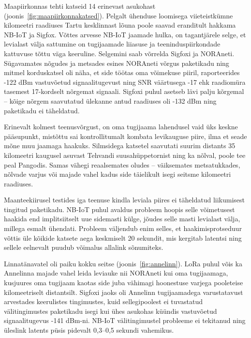 \documentclass[12pt]{article}
\begin{document}
    Maapiirkonnas tehti katseid 14 erinevast asukohast (joonis~\ref{fig:maapiirkonnakatsed}). Pelgalt ühenduse loomisega viieteistkümne kilomeetri raadiuses Tartu kesklinnast lõuna poole saavad eranditult hakkama NB-IoT ja Sigfox.
    Võttes arvesse NB-IoT jaamade hulka, on tagantjärele selge, et levialast välja sattumine on tugijaamade liiasuse ja teeninduspiirkondade kattuvuse tõttu väga keeruline.
    Selgemini saab võrrelda Sigfoxi ja NORAneti.
    Sügavamates nõgudes ja metsades esines NORAneti võrgus paketikadu ning mitmel korduskatsel oli näha, et side töötas oma võimekuse piiril, raporteerides -122 dBm vastuvõetud signaalitugevust ning SNR väärtusega -17 ehk raadiomüra tasemest 17-kordselt nõrgemat signaali.
    Sigfoxi puhul asetseb lävi palju kõrgemal -- kõige nõrgem saavutatud ülekanne antud raadiuses oli -132 dBm ning paketikadu ei täheldatud.

    Erinevalt kolmest teenusvõrgust, on oma tugijaama lahendusel vaid üks keskne pääsupunkt, mistõttu sai kontrollitumalt kombata levikauguse piire, ilma et seade mõne muu jaamaga haakuks.
    Silmsidega katsetel saavutati suurim distants 35 kilomeetri kaugusel asuvast Tehvandi suusahüppetornist ning ka nõlval, poole tee peal Pangodis.
    Samas vähegi reaalsemates oludes -- väiksemates metsatukkades, nõlvade varjus või majade vahel kadus side täielikult isegi seitsme kilomeetri raadiuses.

    Maanteekiirusel testides iga teenuse kindla leviala piires ei täheldatud liikumisest tingitud paketikadu.
    NB-IoT puhul avaldus probleem hoopis selle võimetusest haakida end implitsiitselt uue sidemasti külge, jõudes selle masti levialast välja, millega esmalt ühendati.
    Probleem väljendub enim selles, et haakimisprotseduur võttis üle kõikide katsete aega keskmiselt 20 sekundit, mis kergitab latentsi ning sellele eelnevalt puudub võimalus allalink sõnumiteks.

    Linnatänavatel oli paiku kokku seitse (joonis~\ref{fig:annelinn}).
    LoRa puhul võis ka Annelinna majade vahel leida leviauke nii NORAneti kui oma tugijaamaga, kusjuures oma tugijaam kaotas side juba vähimagi hoonestuse varjega pooleteise kilomeetriselt distantsilt.
    Sigfoxi jaoks oli Annelinn tugijaamadega varustatavust arvestades keerulistes tingimustes, kuid sellegipoolest ei tuvastatud välitingimustes paketikadu isegi kui ühes asukohas küündis vastuvõetud signaalitugevus -141 dBm-ni.
    NB-IoT välitingimustel probleeme ei tekitanud ning üleslink latents püsis pidevalt 0,3--0,5 sekundi vahemikus.
\end{document}
